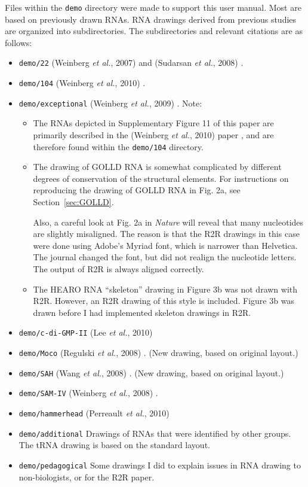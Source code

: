 \documentclass[letterpaper,12pt]{report}
\begin{document}
Files within the {\tt demo} directory were made to support this user manual.  Most are based on previously drawn RNAs.
RNA drawings derived from previous studies are organized into subdirectories.
The subdirectories and relevant citations are as follows:
\begin{itemize}
\item {\tt demo/22} (Weinberg {\it et al.}, 2007) \cite{Weinberg22Motifs} and (Sudarsan {\it et al.}, 2008) \cite{SudarsanGEMM}.
\item {\tt demo/104} (Weinberg {\it et al.}, 2010) \cite{Weinberg104Motifs}.
\item {\tt demo/exceptional} (Weinberg {\it et al.}, 2009) \cite{CoolRNAs}. Note:
	\begin{itemize}
	\item The RNAs depicted in Supplementary Figure 11 of this paper are primarily described in the (Weinberg {\it et al.}, 2010) paper \cite{Weinberg104Motifs}, and are therefore found within the {\tt demo/104} directory.
	\item The drawing of GOLLD RNA is somewhat complicated by different degrees of conservation of the structural elements.  For instructions on reproducing the drawing of GOLLD RNA in Fig. 2a, see Section~\ref{sec:GOLLD}.

Also, a careful look at Fig. 2a in {\it Nature} will reveal that many nucleotides are slightly misaligned.  The reason is that the R2R drawings in this case were done using Adobe's Myriad font, which is narrower than Helvetica.  The journal changed the font, but did not realign the nucleotide letters.  The output of R2R is always aligned correctly.
	\item The HEARO RNA ``skeleton'' drawing in Figure 3b was not drawn with R2R.  However, an R2R drawing of this style is included.  Figure 3b was drawn before I had implemented skeleton drawings in R2R.
	\end{itemize}
\item {\tt demo/c-di-GMP-II} (Lee {\it et al.}, 2010) \cite{GEMMII}
\item {\tt demo/Moco} (Regulski {\it et al.}, 2008) \cite{RegulskiMoco}.  (New drawing, based on original layout.)
\item {\tt demo/SAH} (Wang {\it et al.}, 2008) \cite{SAH}. (New drawing, based on original layout.)
\item {\tt demo/SAM-IV} (Weinberg {\it et al.}, 2008) \cite{SAMIV}.
\item {\tt demo/hammerhead} (Perreault {\it et al.}, 2010) \cite{hammerhead}
\item {\tt demo/additional} Drawings of RNAs that were identified by other groups.  The tRNA drawing is based on the standard layout.
\item {\tt demo/pedagogical} Some drawings I did to explain issues in RNA drawing to non-biologists, or for the R2R paper.
\end{itemize}
\end{document}
